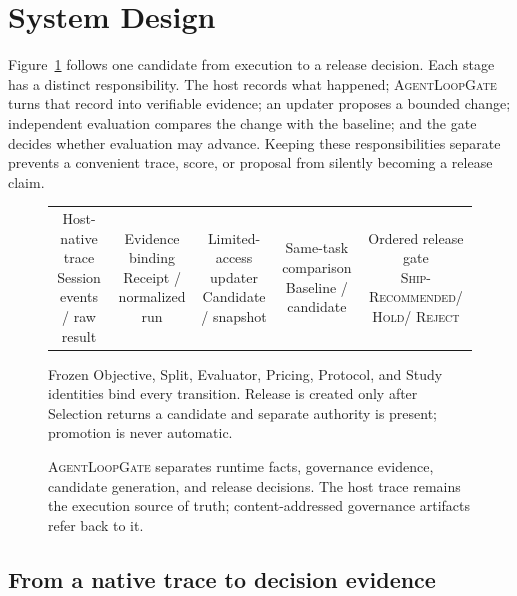 \documentclass[10pt,twocolumn]{article}
\newcommand{\system}{\textsc{AgentLoopGate}\xspace}
\newcommand{\hold}{\textsc{Hold}\xspace}
\newcommand{\ship}{\textsc{Ship-Recommended}\xspace}
\newcommand{\reject}{\textsc{Reject}\xspace}
\begin{document}
\section{System Design}

Figure~\ref{fig:architecture} follows one candidate from execution to a release
decision. Each stage has a distinct responsibility. The host records what
happened; \system turns that record into verifiable evidence; an updater
proposes a bounded change; independent evaluation compares the change with the
baseline; and the gate decides whether evaluation may advance. Keeping these
responsibilities separate prevents a convenient trace, score, or proposal from
silently becoming a release claim.

\begin{figure}[t]
\centering
\setlength{\tabcolsep}{3pt}
\renewcommand{\arraystretch}{1.35}
\begin{tabular}{c@{\ $\rightarrow$\ }c@{\ $\rightarrow$\ }c@{\ $\rightarrow$\ }c@{\ $\rightarrow$\ }c}
\fbox{\parbox{0.155\textwidth}{\centering Host-native trace\\Session events / raw result}}
& \fbox{\parbox{0.155\textwidth}{\centering Evidence binding\\Receipt / normalized run}}
& \fbox{\parbox{0.155\textwidth}{\centering Limited-access updater\\Candidate / snapshot}}
& \fbox{\parbox{0.155\textwidth}{\centering Same-task comparison\\Baseline / candidate}}
& \fbox{\parbox{0.155\textwidth}{\centering Ordered release gate\\\ship / \hold / \reject}}
\end{tabular}
\vspace{3pt}

\small Frozen Objective, Split, Evaluator, Pricing, Protocol, and Study identities
bind every transition. Release is created only after Selection returns a
candidate and separate authority is present; promotion is never automatic.
\caption{\system separates runtime facts, governance evidence, candidate
generation, and release decisions. The host trace remains the execution source
of truth; content-addressed governance artifacts refer back to it.}
\label{fig:architecture}
\end{figure}

\subsection{From a native trace to decision evidence}
\end{document}
